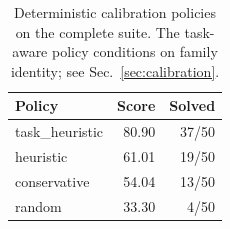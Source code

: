 \begin{table}[t]
\caption{Deterministic calibration policies on the complete suite. The task-aware policy conditions on family identity; see Sec.~\ref{sec:calibration}.}
\label{tab:baselines}
\centering\small
\begin{tabular}{lrr}
\toprule
Policy & Score & Solved \\
\midrule
task\_heuristic & 80.90 & 37/50 \\
heuristic & 61.01 & 19/50 \\
conservative & 54.04 & 13/50 \\
random & 33.30 & 4/50 \\
\bottomrule
\end{tabular}
\end{table}
